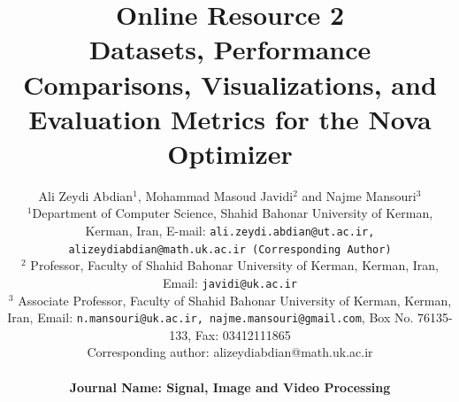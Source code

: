 \documentclass{article}
\date{}
\begin{document}
\title{\centering Online Resource 2\\ \vspace{0.5cm} Datasets, Performance Comparisons, Visualizations, and Evaluation Metrics for the Nova Optimizer}

\author{Ali Zeydi Abdian$^1$, Mohammad Masoud Javidi$^2$ and Najme Mansouri$^3$ \\
$^1$Department of Computer Science, Shahid Bahonar University of Kerman, Kerman, Iran,   E-mail: \texttt{ali.zeydi.abdian@ut.ac.ir, alizeydiabdian@math.uk.ac.ir (Corresponding Author)} \\
$^2$ Professor, Faculty of Shahid Bahonar University of Kerman, Kerman, Iran,  Email: \texttt{javidi@uk.ac.ir} \\

$^3$ Associate Professor, Faculty of Shahid Bahonar University of Kerman, Kerman, Iran, Email: \texttt{n.mansouri@uk.ac.ir, najme.mansouri@gmail.com}, Box No. 76135-133, Fax: 03412111865\\ 
Corresponding author: alizeydiabdian@math.uk.ac.ir\\

\vspace{0.5cm}

\bf Journal Name: Signal, Image and Video Processing}


%
% 
% 
%
%
\end{document}
